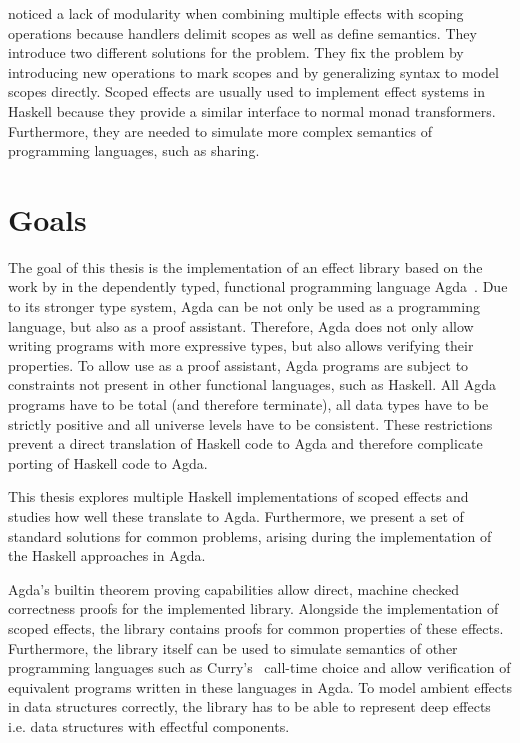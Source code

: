 \documentclass[10pt,a4paper,twoside,notitlepage]{report}
\begin{document}
\textcite{DBLP:conf/haskell/WuSH14} noticed a lack of modularity when
combining multiple effects with scoping operations because handlers delimit
scopes as well as define semantics.
They introduce two different solutions for the problem.
They fix the problem by introducing new operations to mark scopes and by
generalizing syntax to model scopes directly.
Scoped effects are usually used to implement effect systems in Haskell because
they provide a similar interface to normal monad transformers.
Furthermore, they are needed to simulate more complex semantics of programming
languages, such as sharing.


\section{Goals}

The goal of this thesis is the implementation of an effect library based on the
work by \textcite{DBLP:conf/haskell/WuSH14,DBLP:conf/lics/PirogSWJ18} in
the dependently typed, functional programming language
Agda~\cite{norell:thesis}.
Due to its stronger type system, Agda can be not only be used as a programming
language, but also as a proof assistant.
Therefore, Agda does not only allow writing programs with more expressive types,
but also allows verifying their properties.
To allow use as a proof assistant, Agda programs are subject to constraints not
present in other functional languages, such as Haskell.
All Agda programs have to be total (and therefore terminate), all data types
have to be strictly positive and all universe levels have to be consistent.
These restrictions prevent a direct translation of Haskell code to Agda and
therefore complicate porting of Haskell code to Agda.

This thesis explores multiple Haskell implementations of scoped effects and
studies how well these translate to Agda.
Furthermore, we present a set of standard solutions for common problems, arising
during the implementation of the Haskell approaches in Agda.

Agda's builtin theorem proving capabilities allow direct, machine checked
correctness proofs for the implemented library.
Alongside the implementation of scoped effects, the library contains proofs for
common properties of these effects.
Furthermore, the library itself can be used to simulate semantics of other
programming languages such as Curry's~\cite{Hanus95curry} call-time choice and
allow verification of equivalent programs written in these languages in Agda.
To model ambient effects in data structures correctly, the library has to be
able to represent deep effects i.e. data structures with effectful components.
\end{document}
